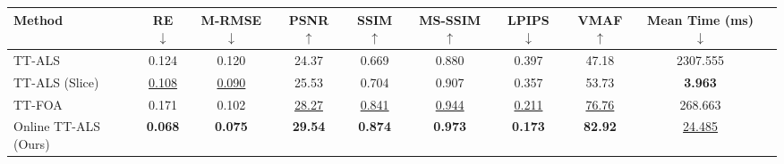 \documentclass[a4paper, 11pt]{article}
\theoremstyle{plain}
\theoremstyle{definition}
\theoremstyle{remark}
\begin{document}
\begin{table}[t]
\begin{minipage}[t]{0.48\linewidth}
{\begin{tabular}{l cc c cc c cc c}
        \textbf{Method} & RE $\downarrow$ & M-RMSE $\downarrow$ & PSNR $\uparrow$ & SSIM $\uparrow$ & MS-SSIM $\uparrow$ & LPIPS $\downarrow$ & VMAF $\uparrow$ & \makecell{Mean Time \\ (ms) $\downarrow$} \\
        \midrule
        TT-ALS                & 0.124 & 0.120 & 24.37 & 0.669 & 0.880 & 0.397 & 47.18 & 2307.555 \\
        TT-ALS (Slice)        & \underline{0.108} & \underline{0.090} & 25.53 & 0.704 & 0.907 & 0.357 & 53.73 & \textbf{3.963} \\
        TT-FOA                & 0.171 & 0.102 & \underline{28.27} & \underline{0.841} & \underline{0.944} & \underline{0.211} & \underline{76.76} & 268.663 \\
        Online TT-ALS (Ours) & \textbf{0.068} & \textbf{0.075} & \textbf{29.54} & \textbf{0.874} & \textbf{0.973} & \textbf{0.173} & \textbf{82.92} & \underline{24.485} \\
        \bottomrule
        \end{tabular}
        }
    \end{minipage}
\end{table}
\end{document}
